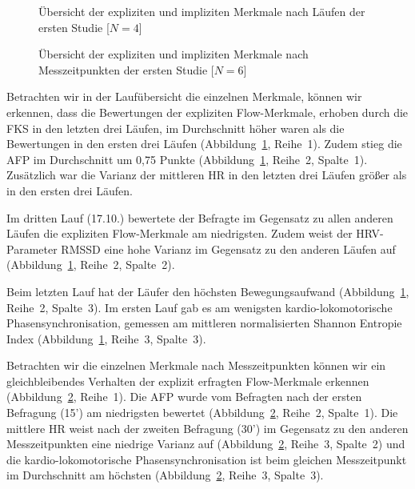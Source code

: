 \label{ssub:beobachtungen_5_1} 
\begin{figure}
	[!htb]  \caption[Übersicht der expliziten und impliziten Merkmale nach Läufen (Erste Studie: Laufen)]{Übersicht der expliziten und impliziten Merkmale nach Läufen der ersten Studie [$N = 4$]} \label{fig:ubersicht_nach_laufen_1} 
\end{figure}
\begin{figure}
	[!htb]  \caption[Übersicht der expliziten und impliziten Merkmale nach Messzeitpunkten (Erste Studie: Laufen)]{Übersicht der expliziten und impliziten Merkmale nach Messzeitpunkten der ersten Studie [$N = 6$]} \label{fig:ubersicht_nach_messzeitpunkten_1} 
\end{figure}

Betrachten wir in der Laufübersicht die einzelnen Merkmale, können wir erkennen, dass die Bewertungen der expliziten Flow-Merkmale, erhoben durch die \ac{FKS} in den letzten drei Läufen, im Durchschnitt höher waren als die Bewertungen in den ersten drei Läufen (Abbildung~\ref{fig:ubersicht_nach_laufen_1}, Reihe~1). Zudem stieg die \ac{AFP} im Durchschnitt um 0,75 Punkte (Abbildung~\ref{fig:ubersicht_nach_laufen_1}, Reihe~2, Spalte~1). Zusätzlich war die Varianz der mittleren \ac{HR} in den letzten drei Läufen größer als in den ersten drei Läufen. 

Im dritten Lauf (17.10.) bewertete der Befragte im Gegensatz zu allen anderen Läufen die expliziten Flow-Merkmale am niedrigsten. Zudem weist der \ac{HRV}-Parameter \acs{RMSSD} eine hohe Varianz im Gegensatz zu den anderen Läufen auf (Abbildung~\ref{fig:ubersicht_nach_laufen_1}, Reihe~2, Spalte~2). 

Beim letzten Lauf hat der Läufer den höchsten Bewegungsaufwand (Abbildung~\ref{fig:ubersicht_nach_laufen_1}, Reihe~2, Spalte~3). Im ersten Lauf gab es am wenigsten kardio-lokomotorische Phasensynchronisation, gemessen am mittleren normalisierten Shannon Entropie Index (Abbildung~\ref{fig:ubersicht_nach_laufen_1}, Reihe~3, Spalte~3).

Betrachten wir die einzelnen Merkmale nach Messzeitpunkten können wir ein gleichbleibendes Verhalten der explizit erfragten Flow-Merkmale erkennen (Abbildung~\ref{fig:ubersicht_nach_messzeitpunkten_1}, Reihe~1). Die \ac{AFP} wurde vom Befragten nach der ersten Befragung (15') am niedrigsten bewertet (Abbildung~\ref{fig:ubersicht_nach_messzeitpunkten_1}, Reihe~2, Spalte~1). Die mittlere \ac{HR} weist nach der zweiten Befragung (30') im Gegensatz zu den anderen Messzeitpunkten eine niedrige Varianz auf (Abbildung~\ref{fig:ubersicht_nach_messzeitpunkten_1}, Reihe~3, Spalte~2) und die kardio-lokomotorische Phasensynchronisation ist beim gleichen Messzeitpunkt im Durchschnitt am höchsten (Abbildung~\ref{fig:ubersicht_nach_messzeitpunkten_1}, Reihe~3, Spalte~3). 

